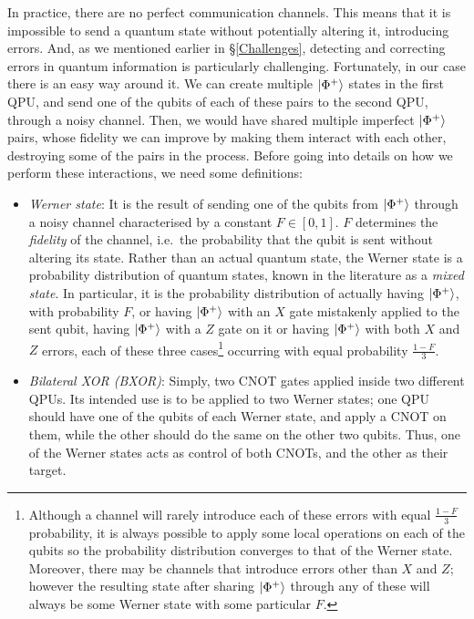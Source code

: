 In practice, there are no perfect communication channels. This means that it is impossible to send a quantum state without potentially altering it, introducing errors. And, as we mentioned earlier in \S\ref{Challenges}, detecting and correcting errors in quantum information is particularly challenging. Fortunately, in our case there is an easy way around it. We can create multiple \(\vert \Phi^+ \rangle\) states in the first QPU, and send one of the qubits of each of these pairs to the second QPU, through a noisy channel. Then, we would have shared multiple imperfect \(\vert \Phi^+ \rangle\) pairs, whose fidelity we can improve by making them interact with each other, destroying some of the pairs in the process. Before going into details on how we perform these interactions, we need some definitions:

\begin{itemize}
  \item \textit{Werner state}: It is the result of sending one of the qubits from \(\vert \Phi^+ \rangle\) through a noisy channel characterised by a constant \(F \in [0,1]\). \(F\) determines the \textit{fidelity} of the channel, i.e.\ the probability that the qubit is sent without altering its state. Rather than an actual quantum state, the Werner state is a probability distribution of quantum states, known in the literature as a \textit{mixed state}. In particular, it is the probability distribution of actually having \(\vert \Phi^+ \rangle\), with probability \(F\), or having \(\vert \Phi^+ \rangle\) with an \(X\) gate mistakenly applied to the sent qubit, having \(\vert \Phi^+ \rangle\) with a \(Z\) gate on it or having \(\vert \Phi^+ \rangle\) with both \(X\) and \(Z\) errors, each of these three cases\footnote{Although a channel will rarely introduce each of these errors with equal \(\frac{1-F}{3}\) probability, it is always possible to apply some local operations on each of the qubits so the probability distribution converges to that of the Werner state. Moreover, there may be channels that introduce errors other than \(X\) and \(Z\); however the resulting state after sharing \(\vert \Phi^+ \rangle\) through any of these will always be some Werner state with some particular \(F\).} occurring with equal probability \(\frac{1-F}{3}\).

  \item \textit{Bilateral XOR (BXOR)}: Simply, two CNOT gates applied inside two different QPUs. Its intended use is to be applied to two Werner states; one QPU should have one of the qubits of each Werner state, and apply a CNOT on them, while the other should do the same on the other two qubits. Thus, one of the Werner states acts as control of both CNOTs, and the other as their target.
\end{itemize}

